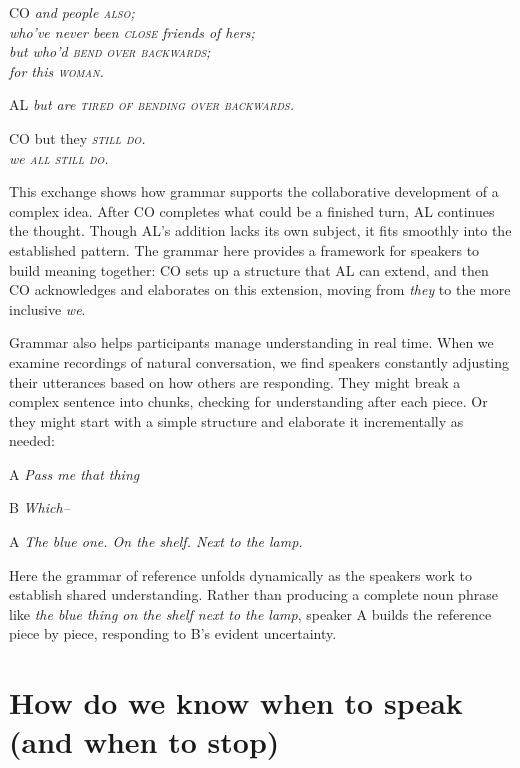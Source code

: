 \ea 
\begin{dialogue}
   \item[CO] \textit{and people \textsc{also};} \\
   \textit{who've never been \textsc{close} friends of hers;} \\
   \textit{but who'd \textsc{bend over backwards};} \\
   \textit{for this \textsc{woman.}}
   \item[AL] \textit{but are \textsc{tired of bending over backwards.}}
   \item[CO] but they \textsc{\textit{still do.}} \\
   \textit{we \textsc{all still do.}}
\end{dialogue}
\z
This exchange shows how grammar supports the collaborative development of a complex idea. After CO completes what could be a finished turn, AL continues the thought. Though AL's addition lacks its own subject, it fits smoothly into the established pattern. The grammar here provides a framework for speakers to build meaning together: CO sets up a structure that AL can extend, and then CO acknowledges and elaborates on this extension, moving from \textit{they} to the more inclusive \textit{we}.

Grammar also helps participants manage understanding in real time. When we examine recordings of natural conversation, we find speakers constantly adjusting their utterances based on how others are responding. They might break a complex sentence into chunks, checking for understanding after each piece. Or they might start with a simple structure and elaborate it incrementally as needed:

\ea
\begin{dialogue}
\item[A] \textit{Pass me that thing}
\item[B] \textit{Which--}
\item[A] \textit{The blue one. On the shelf. Next to the lamp.}
\end{dialogue}
\z
Here the grammar of reference unfolds dynamically as the speakers work to establish shared understanding. Rather than producing a complete noun phrase like \textit{the blue thing on the shelf next to the lamp}, speaker A builds the reference piece by piece, responding to B's evident uncertainty.

\section{How do we know when to speak (and when to stop)} \label{sec:turn-arch}


